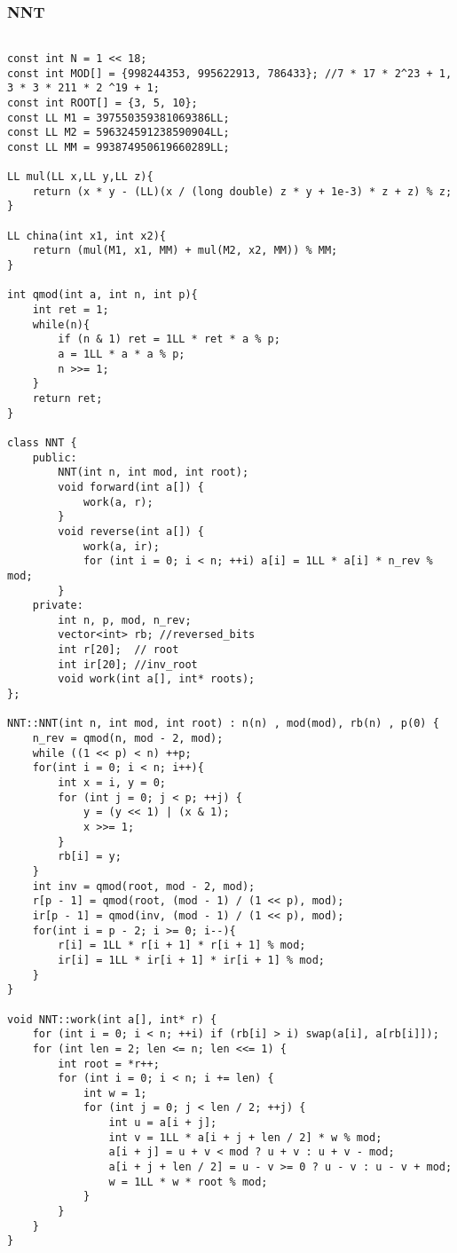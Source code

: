 \subsubsection{NNT}
\begin{verbatim}

const int N = 1 << 18;  
const int MOD[] = {998244353, 995622913, 786433}; //7 * 17 * 2^23 + 1, 3 * 3 * 211 * 2 ^19 + 1;
const int ROOT[] = {3, 5, 10};
const LL M1 = 397550359381069386LL;
const LL M2 = 596324591238590904LL;
const LL MM = 993874950619660289LL;

LL mul(LL x,LL y,LL z){
    return (x * y - (LL)(x / (long double) z * y + 1e-3) * z + z) % z;
}

LL china(int x1, int x2){
    return (mul(M1, x1, MM) + mul(M2, x2, MM)) % MM;
}

int qmod(int a, int n, int p){
    int ret = 1;
    while(n){
        if (n & 1) ret = 1LL * ret * a % p;
        a = 1LL * a * a % p;
        n >>= 1;
    }
    return ret;
}

class NNT {
    public:
        NNT(int n, int mod, int root);
        void forward(int a[]) {
            work(a, r);
        }
        void reverse(int a[]) {
            work(a, ir);
            for (int i = 0; i < n; ++i) a[i] = 1LL * a[i] * n_rev % mod;
        }
    private:
        int n, p, mod, n_rev;
        vector<int> rb; //reversed_bits
        int r[20];  // root
        int ir[20]; //inv_root
        void work(int a[], int* roots);
};

NNT::NNT(int n, int mod, int root) : n(n) , mod(mod), rb(n) , p(0) {
    n_rev = qmod(n, mod - 2, mod);
    while ((1 << p) < n) ++p;
    for(int i = 0; i < n; i++){
        int x = i, y = 0;
        for (int j = 0; j < p; ++j) {
            y = (y << 1) | (x & 1);
            x >>= 1;
        }
        rb[i] = y;
    }
    int inv = qmod(root, mod - 2, mod);
    r[p - 1] = qmod(root, (mod - 1) / (1 << p), mod);
    ir[p - 1] = qmod(inv, (mod - 1) / (1 << p), mod);
    for(int i = p - 2; i >= 0; i--){
        r[i] = 1LL * r[i + 1] * r[i + 1] % mod;
        ir[i] = 1LL * ir[i + 1] * ir[i + 1] % mod;
    }
}

void NNT::work(int a[], int* r) {
    for (int i = 0; i < n; ++i) if (rb[i] > i) swap(a[i], a[rb[i]]);
    for (int len = 2; len <= n; len <<= 1) {
        int root = *r++;
        for (int i = 0; i < n; i += len) {
            int w = 1;
            for (int j = 0; j < len / 2; ++j) {
                int u = a[i + j];
                int v = 1LL * a[i + j + len / 2] * w % mod;
                a[i + j] = u + v < mod ? u + v : u + v - mod;
                a[i + j + len / 2] = u - v >= 0 ? u - v : u - v + mod;
                w = 1LL * w * root % mod;
            }
        }
    }
}
\end{verbatim}
